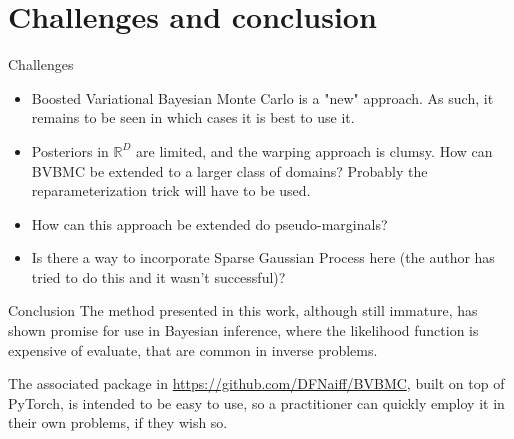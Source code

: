 \documentclass{beamer}
\begin{document}
\section{Challenges and conclusion}
\begin{block}{Challenges}
\begin{itemize}
	\item Boosted Variational Bayesian Monte Carlo is a "new" approach. As such, it remains to be seen in which cases it is best to use it.
	\item Posteriors in $\mathbb{R}^D$ are limited, and the warping approach is clumsy. How can BVBMC be extended to a larger class of domains? Probably the reparameterization trick will have to be used.
	\item How can this approach be extended do pseudo-marginals?
	\item Is there a way to incorporate Sparse Gaussian Process here (the author has tried to do this and it wasn't successful)?
\end{itemize}
\end{block}
\begin{block}{Conclusion}
The method presented in this work, although still immature, has shown promise for use in Bayesian inference, where the likelihood function is expensive of evaluate, that are common in inverse problems.

The associated package in \url{https://github.com/DFNaiff/BVBMC}, built on top of PyTorch, is intended to be easy to use, so a practitioner can quickly employ it in their own problems, if they wish so.

\end{block}
\end{document}
